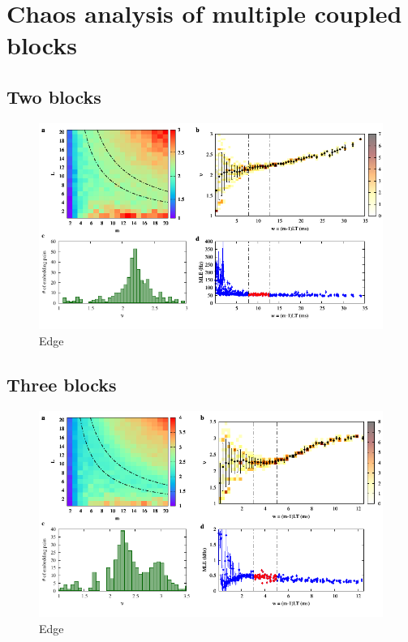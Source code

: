 \chapter{Chaos analysis of multiple coupled blocks}
\label{chap: multi block}

\section{Two blocks}

\begin{figure}[H]
    \centering
    \includegraphics[width=\linewidth]{../2_blocks/1e5_points/plots/chaos.pdf}
    \caption{Edge}
    \label{fig:2 blocks chaos}
\end{figure}


\section{Three blocks}

\begin{figure}[H]
    \centering
    \includegraphics[width=\linewidth]{../3_blocks/edge/2e5_points/plots/chaos_low.pdf}
    \caption{Edge}
    \label{fig:3 blocks chaos}
\end{figure}

